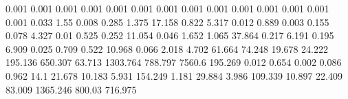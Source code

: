 0.001      0.001      %
0.001      0.001      %
0.001      0.001      %
0.001      0.001      %
0.001      0.001      %
0.001      0.001      %
0.001      0.001      %
0.033      1.55       %
0.008      0.285      %
1.375      17.158     %
0.822      5.317      %
0.012      0.889      %
0.003      0.155      %
0.078      4.327      %
0.01       0.525      %
0.252      11.054     %
0.046      1.652      %
1.065      37.864     %
0.217      6.191      %
0.195      6.909      %
0.025      0.709      %
0.522      10.968     %
0.066      2.018      %
4.702      61.664     %
74.248     19.678     %
24.222     195.136    %
650.307    63.713     %
1303.764   788.797    %
7560.6     195.269    %
0.012      0.654      %
0.002      0.086      %
0.962      14.1       %
21.678     10.183     %
5.931      154.249    %
1.181      29.884     %
3.986      109.339    %
10.897     22.409     %
83.009     1365.246   %
800.03     716.975    %
